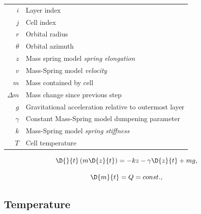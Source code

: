 \begin{center}
\begin{tabular}{r|l}
$i$			& Layer index \\
$j$			& Cell index \\
$r$			& Orbital radius \\
$\theta$	& Orbital azimuth \\ 
$z$			& Mass spring model \emph{spring elongation}  \\
$v$			& Mass-Spring model \emph{velocity} \\
$m$			& Mass contained by cell \\
$\Delta m$ 	& Mass change since previous step \\
$g$			& Gravitational acceleration relative to outermost layer \\
$\gamma$	& Constant Mass-Spring model dumpening parameter \\
$k$			& Mass-Spring model \emph{spring stiffness} \\
$T$			& Cell temperature \\ 
\end{tabular}
\end{center}

\begin{equation}
    \D{}{t} \left(m \D{z}{t}\right) = -kz - \gamma\D{z}{t} + mg,
\end{equation}

\begin{equation}
    \D{m}{t} = Q = const.,
\end{equation}



\subsection{Temperature}




\section{}
